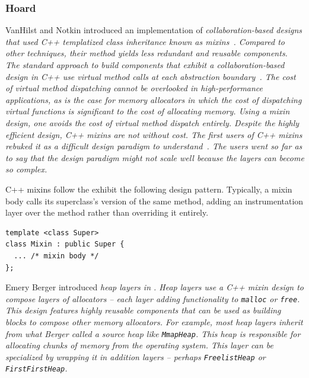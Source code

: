 \subsubsection{Hoard}
VanHilst and Notkin introduced an implementation of \em collaboration-based \em designs that used C++ templatized class inheritance known as \em mixins\em~\cite{Smaragdakis:2000:MPC:645417.652070}.  Compared to other techniques, their method yields less redundant and reusable components.  The standard approach to build components that exhibit a collaboration-based design in C++ use virtual method calls at each abstraction boundary~\cite{Berger:2002:MMH:997313}.  The cost of virtual method dispatching cannot be overlooked in high-performance applications, as is the case for memory allocators in which the cost of dispatching virtual functions is significant to the cost of allocating memory.  Using a mixin design, one avoids the cost of virtual method dispatch entirely.  Despite the highly efficient design, C++ mixins are not without cost.  The first users of C++ mixins rebuked it as a difficult design paradigm to understand~\cite{Smaragdakis:2000:MPC:645417.652070}.  The users went so far as to say that the design paradigm might not scale well because the layers can become so complex.

C++ mixins follow the exhibit the following design pattern.  Typically, a mixin body calls its superclass's version of the same method, adding an instrumentation layer over the method rather than overriding it entirely.

\begin{verbatim}
template <class Super> 
class Mixin : public Super {
  ... /* mixin body */
};
\end{verbatim}

Emery Berger introduced \em heap layers \em in \cite{Berger:2002:MMH:997313}.  Heap layers use a C++ mixin design to compose layers of allocators -- each layer adding functionality to \verb,malloc, or \verb,free,.  This design features highly reusable components that can be used as building blocks to compose other memory allocators.  For example, most heap layers inherit from what Berger called a \em source heap \em like \verb,MmapHeap,.  This heap is responsible for allocating chunks of memory from the operating system.  This layer can be specialized by wrapping it in addition layers -- perhaps \verb,FreelistHeap, or \verb,FirstFirstHeap,.


